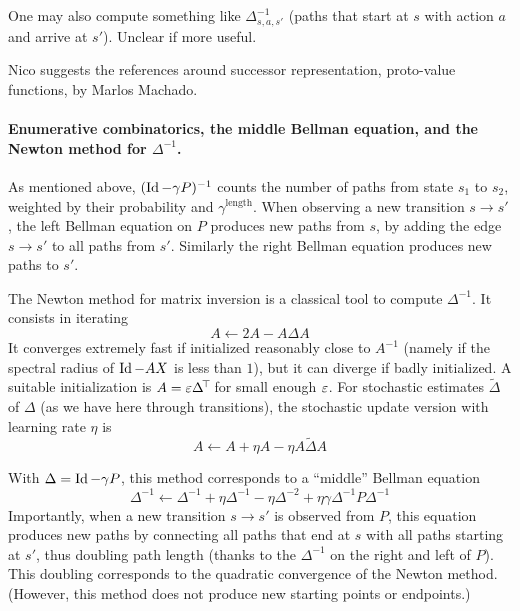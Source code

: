 \documentclass[11pt,a4paper]{article}
\begin{document}
One may also compute something like $\Delta^{-1}_{s,a,s'}$ (paths that start
at $s$ with action $a$ and arrive at $s'$). Unclear if more useful.

Nico suggests the references around successor representation, proto-value
functions, by Marlos Machado.

\paragraph{Enumerative combinatorics, the middle Bellman equation, and
the Newton method for $\Delta^{-1}$.} As mentioned above, $(\operatorname{Id}-\gamma
P)^{-1}$ counts the number of paths from state $s_1$ to $s_2$, weighted
by their probability and $\gamma^\mathrm{length}$. When observing a new
transition $s\to s'$, the left Bellman equation on $P$ produces new paths
from $s$, by adding the edge $s\to s'$ to all paths from $s'$. Similarly
the right Bellman equation produces new paths to $s'$.

The Newton method for matrix inversion is a classical tool to compute
$\Delta^{-1}$. It consists in iterating
\begin{equation}
A\gets 2A-A\Delta A
\end{equation}
It converges extremely fast if initialized reasonably close to $A^{-1}$ (namely if the spectral
radius of $\operatorname{Id}-AX$ is less than $1$), but it can diverge if badly
initialized. A suitable initialization is $A=\varepsilon\Delta^{\!\top}\!$ for
small enough $\varepsilon$. For stochastic estimates $\tilde \Delta$ of $\Delta$ (as we have
here through transitions), the stochastic update version with learning
rate $\eta$ is
\begin{equation}
A\gets A+\eta A-\eta A\tilde \Delta A
\end{equation}

With $\Delta=\operatorname{Id}-\gamma P$, 
this method corresponds to a ``middle'' Bellman equation
\begin{equation}
\Delta^{-1}\gets \Delta^{-1}+\eta\Delta^{-1}-\eta \Delta^{-2}+\eta \gamma \Delta^{-1}P\Delta^{-1}
\end{equation}
Importantly, when a new transition $s\to s'$ is observed from $P$, this equation
produces new paths by connecting all paths that end at $s$ with all paths
starting at $s'$, thus doubling path length (thanks to the $\Delta^{-1}$
on the right and left of $P$). This doubling corresponds to the
quadratic convergence of the Newton method. (However, this method does not
produce new starting points or endpoints.)
\end{document}
